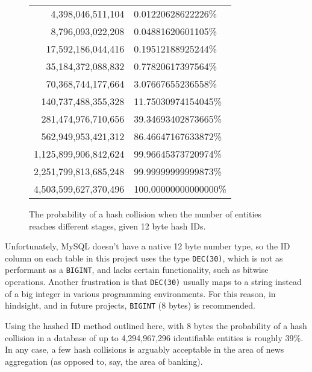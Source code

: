 \begin{figure}
\begin{tabular}{r|l}
    4,398,046,511,104       &   0.01220628622226\%\\
    8,796,093,022,208       &   0.04881620601105\%\\
    17,592,186,044,416      &   0.19512188925244\%\\
    35,184,372,088,832      &   0.77820617397564\%\\
    70,368,744,177,664      &   3.07667655236558\%\\
    140,737,488,355,328     &  11.75030974154045\%\\
    281,474,976,710,656     &  39.34693402873665\%\\
    562,949,953,421,312     &  86.46647167633872\%\\
    1,125,899,906,842,624   &  99.96645373720974\%\\
    2,251,799,813,685,248   &  99.99999999999873\%\\
    4,503,599,627,370,496   & 100.00000000000000\%
    \end{tabular}
    \doublespacing
    \caption{The probability of a hash collision when the number of entities reaches different stages, given 12 byte hash IDs.}
    \label{bday}
\end{figure}

Unfortunately, MySQL doesn't have a native 12 byte number type, so the
ID column on each table in this project uses the type {\tt DEC(30)},
which is not as performant as a {\tt BIGINT}, and lacks certain
functionality, such as bitwise operations.  Another frustration is that
{\tt DEC(30)} usually maps to a string instead of a big integer in
various programming environments.  For this reason, in hindsight, and
in future projects, {\tt BIGINT} (8 bytes) is recommended.

Using the hashed ID method outlined here, with 8 bytes
the probability of a hash collision in a database of up to 4,294,967,296
identifiable entities is roughly 39\%.  In any case, a few hash
collisions is arguably acceptable in the area of news aggregation
(as opposed to, say, the area of banking).

